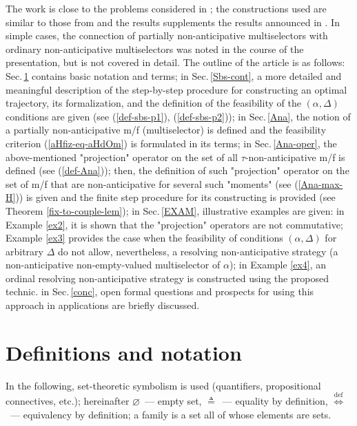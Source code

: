 \documentclass[sn-mathphys,Numbered,pdflatex]{sn-jnl}%
\theoremstyle{thmstyleone}%
\theoremstyle{thmstyletwo}%
\theoremstyle{thmstylethree}%
\newcommand{\mydef}{\mathrel{\triangleq}}%
\newcommand{\myeqv}{\ensuremath{\mathrel{\Leftrightarrow}}}%
\newcommand{\myemp}{\ensuremath{\varnothing}}%
\newcommand{\mdef}{\ensuremath{\mathrel{\text{def}}}}%
\newcommand{\mydefeq}{\stackrel{\mdef}{\myeqv}}%
\newcommand{\fref}[1]{{\rm(\ref{#1})}}   %
\begin{document}
The work is close to the problems considered in \cite{GomSer-UDSU2021}; 
the constructions used are similar to those from \cite{Ser_UDSU2017} and the results supplements the results announced in \cite{Ser_CTMM2022e}.
In simple cases, the connection of partially non-anticipative multiselectors with ordinary non-anticipative multiselectors was noted in the course of the presentation, but is not covered in detail.
The outline of the article is as follows:
Sec.\,\ref{sec-def} contains basic notation and terms;
in Sec.\,\ref{Sbs-cont}, a more detailed and meaningful description of the step-by-step procedure for constructing an optimal trajectory, its formalization, and the definition of the feasibility of the $(\alpha, \Delta)$ conditions are given (see \fref{def-sbs-p1}, \fref{def-sbs-p2});
in Sec.\,\ref{Ana}, the notion of a partially non-anticipative m/f  (multiselector) is defined and the feasibility criterion \fref{aHfiz-eq-aHdOm} is formulated in its terms;
in Sec.\,\ref{Ana-oper}, the above-mentioned "projection" operator on the set of all $\tau$-non-anticipative m/f is defined (see \fref{def-Ana});
then, the definition of such "projection" operator on the set of m/f that are non-anticipative for several such "moments" (see \fref{Ana-max-H}) is given and the finite step procedure for its constructing is provided (see Theorem \ref{fix-to-couple-lem});
in Sec.\,\ref{EXAM}, illustrative examples are given:
in Example \ref{ex2}, it is shown that the "projection" operators are not commutative;
Example \ref{ex3} provides the case when the feasibility of conditions $(\alpha, \Delta)$ for arbitrary $\Delta$ do not allow, nevertheless, a resolving non-anticipative strategy (a non-anticipative non-empty-valued multiselector of $\alpha$);
in Example \ref{ex4}, an ordinal resolving non-anticipative strategy is constructed using the proposed technic.
in Sec.\,\ref{conc}, open formal questions and prospects for using this approach in applications are briefly discussed.


\section{Definitions and notation}
\label{sec-def}


In the following, set-theoretic symbolism is used (quantifiers, propositional connectives, etc.);
hereinafter \myemp\ --- empty set, $\mydef$~--- equality by definition, $\mydefeq$~--- equivalency by definition;
a family is a set all of whose elements are sets.
\end{document}
